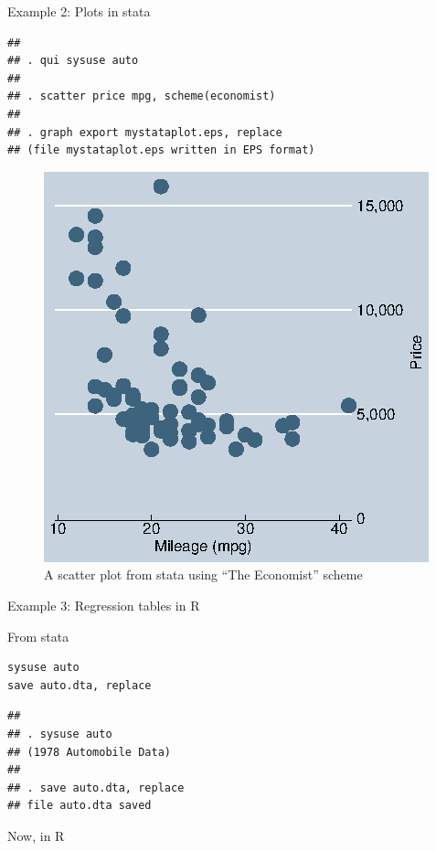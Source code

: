 \begin{frame}[fragile]{Example 2: Plots in stata}

\footnotesize

\begin{verbatim}
## 
## . qui sysuse auto
## 
## . scatter price mpg, scheme(economist)
## 
## . graph export mystataplot.eps, replace
## (file mystataplot.eps written in EPS format)
\end{verbatim}

\end{frame}

\begin{frame}

\begin{figure}
\includegraphics[width=.5\linewidth]{mystataplot.eps}
\caption{A scatter plot from stata using ``The Economist'' scheme}
\end{figure}

\end{frame}

\begin{frame}[fragile]{Example 3: Regression tables in R}

From stata

\footnotesize

\begin{verbatim}
sysuse auto
save auto.dta, replace
\end{verbatim}

\begin{verbatim}
## 
## . sysuse auto
## (1978 Automobile Data)
## 
## . save auto.dta, replace
## file auto.dta saved
\end{verbatim}

\normalsize

Now, in R

\footnotesize

\begin{Shaded}
\begin{Highlighting}[]
\StringTok{ }\NormalTok{(}\NormalTok{)}
\StringTok{ }
\StringTok{ }
\StringTok{ }
\end{Highlighting}
\end{Shaded}

\end{frame}

